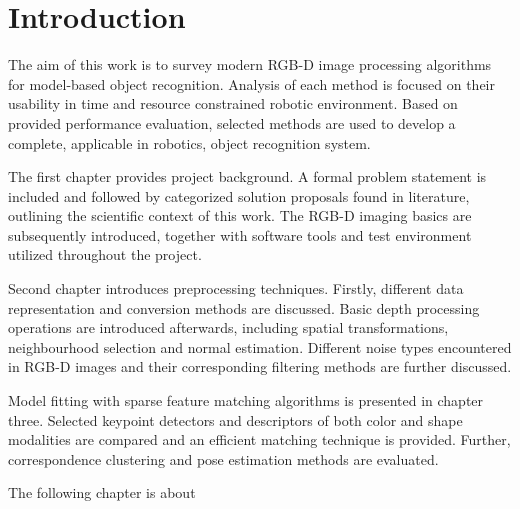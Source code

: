 \chapter*{Introduction}
\label{cha:introduction}



The aim of this work is to survey modern RGB-D image processing algorithms for model-based object recognition. Analysis of each method is focused on their usability in time and resource constrained robotic environment. Based on provided performance evaluation, selected methods are used to develop a complete, applicable in robotics, object recognition system.

The first chapter provides project background. A formal problem statement is included and followed by categorized solution proposals found in literature, outlining the scientific context of this work. The RGB-D imaging basics are subsequently introduced, together with software tools and test environment utilized throughout the project.

Second chapter introduces preprocessing techniques. Firstly, different data representation and conversion methods are discussed. Basic depth processing operations are introduced afterwards, including spatial transformations, neighbourhood selection and normal estimation. Different noise types encountered in RGB-D images and their corresponding filtering methods are further discussed.

Model fitting with sparse feature matching algorithms is presented in chapter three. Selected keypoint detectors and descriptors of both color and shape modalities are compared and an efficient matching technique is provided. Further, correspondence clustering and pose estimation methods are evaluated.

The following chapter is about 



